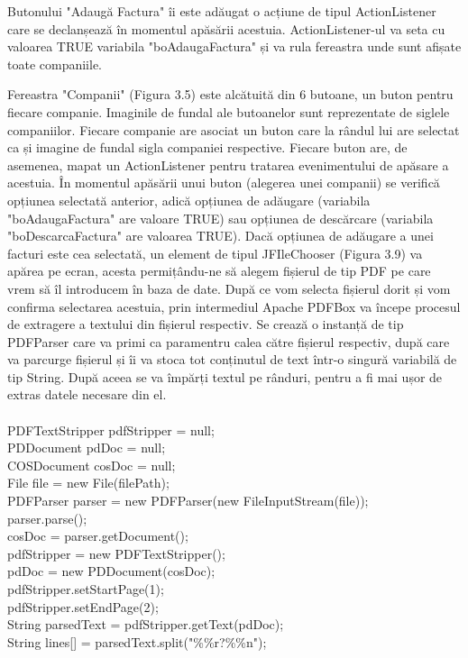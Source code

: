 \documentclass[12pt]{book}
\begin{document}
Butonului "Adaugă Factura" îi este adăugat o acțiune de tipul ActionListener care se declanșează în momentul apăsării acestuia. ActionListener-ul va seta cu valoarea TRUE variabila "boAdaugaFactura" și va rula fereastra unde sunt afișate toate companiile.

Fereastra "Companii" (Figura 3.5) este alcătuită din 6 butoane, un buton pentru fiecare companie. Imaginile de fundal ale butoanelor sunt reprezentate de siglele companiilor. Fiecare companie are asociat un buton care la rândul lui are selectat ca și imagine de fundal sigla companiei respective. Fiecare buton are, de asemenea, mapat un ActionListener pentru tratarea evenimentului de apăsare a acestuia.  În momentul apăsării unui buton (alegerea unei companii) se verifică opțiunea selectată anterior, adică opțiunea de adăugare (variabila "boAdaugaFactura" are valoare TRUE) sau opțiunea de descărcare (variabila "boDescarcaFactura" are valoarea TRUE). Dacă opțiunea de adăugare a unei facturi este cea selectată, un element de tipul JFIleChooser (Figura 3.9) va apărea pe ecran, acesta permițându-ne să alegem fișierul de tip PDF pe care vrem să îl introducem în baza de date. 
După ce vom selecta fișierul dorit și vom confirma selectarea acestuia, prin intermediul Apache PDFBox va începe procesul de extragere a textului din fișierul respectiv. Se crează o instanță de tip PDFParser care va primi ca paramentru calea către fișierul respectiv, după care va parcurge fișierul și îi va stoca tot conținutul de text într-o singură variabilă de tip String. După aceea se va împărți textul pe rânduri, pentru a fi mai ușor de extras datele necesare din el. \\\\
PDFTextStripper pdfStripper = null;\\
PDDocument pdDoc = null;\\
COSDocument cosDoc = null;\\
File file = new File(filePath);\\
PDFParser parser = new PDFParser(new FileInputStream(file));\\
parser.parse();\\
cosDoc = parser.getDocument();\\
pdfStripper = new PDFTextStripper();\\
pdDoc = new PDDocument(cosDoc);\\
pdfStripper.setStartPage(1);\\
pdfStripper.setEndPage(2);\\
String parsedText = pdfStripper.getText(pdDoc);\\
String lines[] = parsedText.split("\%\%r?\%\%n");\\
\end{document}

